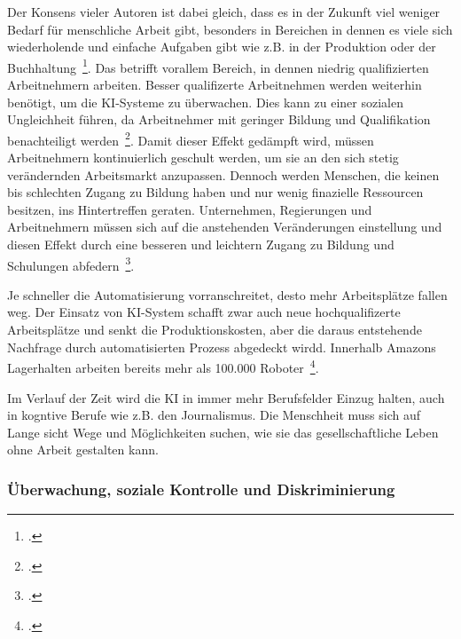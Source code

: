 Der Konsens vieler Autoren ist dabei gleich, dass es in der Zukunft viel weniger Bedarf für menschliche Arbeit gibt, besonders in Bereichen in dennen es viele
sich wiederholende und einfache Aufgaben gibt wie z.B. in der Produktion oder der Buchhaltung~\footcite[\vglf][]{Robot.2023}.
Das betrifft vorallem Bereich, in dennen niedrig qualifizierten Arbeitnehmern arbeiten. Besser qualifizerte Arbeitnehmen werden weiterhin 
benötigt, um die \ac{KI}-Systeme zu überwachen. Dies kann zu einer sozialen Ungleichheit führen, da Arbeitnehmer mit geringer Bildung 
und Qualifikation benachteiligt werden~\footcite[\vglf][]{Robot.2023}. Damit dieser Effekt gedämpft wird, müssen Arbeitnehmern
kontinuierlich geschult werden, um sie an den sich stetig verändernden Arbeitsmarkt anzupassen.
Dennoch werden Menschen, die keinen bis schlechten Zugang zu Bildung haben und nur wenig finazielle Ressourcen besitzen, ins Hintertreffen geraten. 
Unternehmen, Regierungen und Arbeitnehmern müssen sich auf die anstehenden Veränderungen einstellung und diesen Effekt durch eine besseren und leichtern
Zugang zu Bildung und Schulungen abfedern~\footcite[\vglf][]{Robot.2023}.

Je schneller die Automatisierung vorranschreitet, desto mehr Arbeitsplätze fallen weg. Der Einsatz von \ac{KI}-System schafft zwar auch neue hochqualifizerte 
Arbeitsplätze und senkt die Produktionskosten, aber die daraus entstehende Nachfrage durch automatisierten Prozess abgedeckt wirdd.
Innerhalb Amazons Lagerhalten arbeiten bereits mehr als 100.000 Roboter~\footcite[\vglf][]{Kipper.2020}.

Im Verlauf der Zeit wird die \ac{KI} in immer mehr Berufsfelder Einzug halten, auch in kogntive Berufe wie z.B. den Journalismus. Die Menschheit muss sich 
auf Lange sicht Wege und Möglichkeiten suchen, wie sie das gesellschaftliche Leben ohne Arbeit gestalten kann.
    
\subsubsection{Überwachung, soziale Kontrolle und Diskriminierung}

